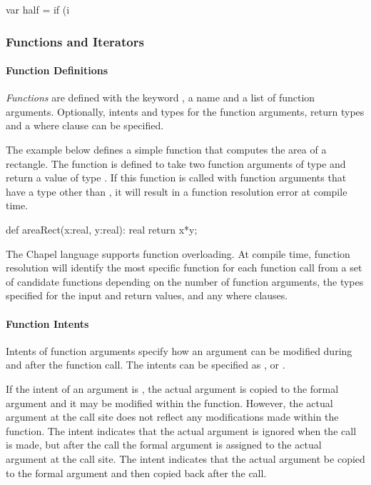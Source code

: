 \begin{example}
\begin{chapel}
var half = if (i %
\end{chapel}
\end{example}

\subsubsection{Functions and Iterators}
\paragraph{Function Definitions}
\emph{Functions} are defined with the keyword , a name and a list of function
arguments.  Optionally, intents and types for the function arguments, return types and 
a where clause can be specified.  

\begin{example}
The example below defines a simple function that computes the area of a rectangle.
The  function is defined to take two function arguments of type
 and return a value of type .  If this function is called with 
function arguments that have a type other than , it will result in a function
resolution error at compile time.
\begin{chapel}
def areaRect(x:real, y:real): real {
  return x*y;
}
\end{chapel}
\end{example}

The Chapel language supports function overloading.  At compile time, function
resolution will identify the most specific function for each function call from a set
of candidate functions depending on the number of function arguments, the types 
specified for the input and return values, and any where clauses.


\paragraph{Function Intents}
Intents of function arguments specify how an argument can be
modified during and after the function call. 
The intents can be specified as ,  or .

If the intent of an argument is , the actual argument is copied 
to the formal argument and it may be modified within the function.  However, 
the actual argument at the call site does not reflect any modifications 
made within the function.  The  intent indicates that the 
actual argument is ignored when the call is made, but after the
call the formal argument is assigned to the actual argument at the call site.
The  intent indicates that the actual argument be copied to 
the formal argument and then copied back after the call.

